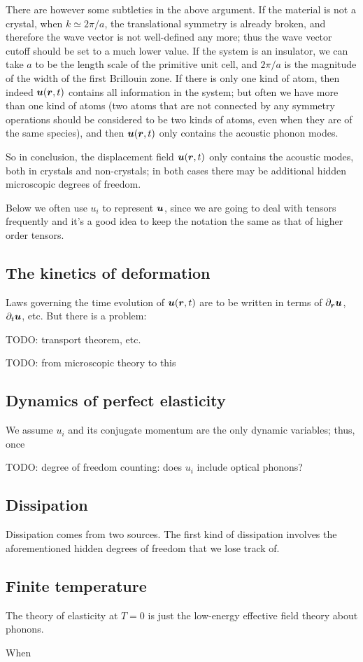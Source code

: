 \documentclass[hyperref, a4paper]{article}
\begin{document}
There are however some subtleties in the above argument.
If the material is not a crystal,
when $k \simeq 2\pi / a$,
the translational symmetry is already broken,
and therefore the wave vector is not well-defined any more;
thus the wave vector cutoff should be set to a much lower value.
If the system is an insulator, 
we can take $a$ to be the length scale of the primitive unit cell,
and $2\pi / a$ is the magnitude of the width of the first Brillouin zone.
If there is only one kind of atom,
then indeed $\vb*{u}(\vb*{r}, t)$ contains all information in the system;
but often we have more than one kind of atoms 
(two atoms that are not connected by any symmetry operations 
should be considered to be two kinds of atoms,
even when they are of the same species),
and then $\vb*{u}(\vb*{r}, t)$ only contains the acoustic phonon modes.

So in conclusion, 
the displacement field $\vb*{u}(\vb*{r}, t)$ only contains 
the acoustic modes,
both in crystals and non-crystals;
in both cases there may be additional hidden microscopic degrees of freedom.

Below we often use $u_i$ to represent $\vb*{u}$, 
since we are going to deal with tensors frequently 
and it's a good idea to keep the notation the same
as that of higher order tensors.

\subsection{The kinetics of deformation}

Laws governing the time evolution of $\vb*{u}(\vb*{r}, t)$
are to be written in terms of $\partial_{\vb*{r}} \vb*{u}$,
$\partial_t \vb*{u}$, etc.
But there is a problem: 


TODO: transport theorem, etc.

TODO: from microscopic theory to this

\subsection{Dynamics of perfect elasticity}

We assume $u_i$ and its conjugate momentum are the only dynamic variables;
thus, once 

TODO: degree of freedom counting: does $u_i$ include optical phonons?

\subsection{Dissipation}

Dissipation comes from two sources.
The first kind of dissipation involves the aforementioned hidden degrees of freedom 
that we lose track of.


\subsection{Finite temperature}

The theory of elasticity at $T = 0$ is just 
the low-energy effective field theory about phonons.

When 
\end{document}
